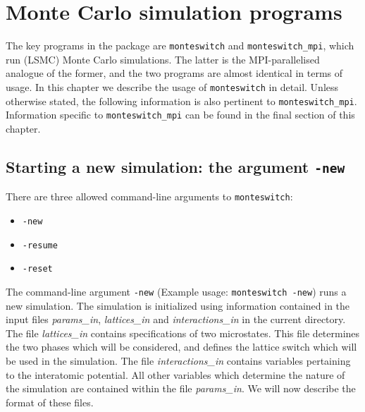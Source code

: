 \documentclass{report}
\begin{document}
\chapter{Monte Carlo simulation programs}\label{chapter:simulation_programs}
The key programs in the package are \texttt{monteswitch} and \texttt{monteswitch\_mpi}, which run (LSMC) Monte Carlo simulations. 
The latter is the MPI-parallelised analogue of the former, and the two programs are almost identical in terms of usage.
In this chapter we describe the usage of \texttt{monteswitch} in detail. Unless otherwise stated, the following information
is also pertinent to \texttt{monteswitch\_mpi}. Information specific to \texttt{monteswitch\_mpi} can be found in 
the final section of this chapter.

\section{Starting a new simulation: the argument \texttt{-new}}
There are three allowed command-line arguments to \texttt{monteswitch}: 
\begin{itemize}
\item\texttt{-new}
\item\texttt{-resume}
\item\texttt{-reset}
\end{itemize}
The command-line argument \texttt{-new} (Example usage: \texttt{monteswitch -new}) runs a new simulation. 
The simulation is initialized using information contained in the input files \emph{params\_in}, \emph{lattices\_in} and \emph{interactions\_in} in
the current directory. The file \emph{lattices\_in} contains specifications of two microstates. This file determines the two phases which will be 
considered, and defines the lattice switch which will be used in the simulation. The file \emph{interactions\_in} contains variables pertaining to 
the interatomic potential. All other variables which determine the nature of the simulation are contained within the file \emph{params\_in}.
We will now describe the format of these files.
\end{document}
